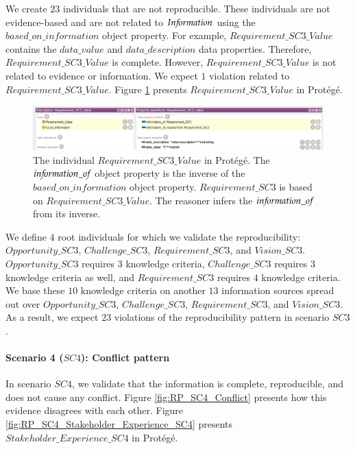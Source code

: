 We create $23$ individuals that are not reproducible. These individuals are not evidence-based and are not related to $In{\mkern-2mu f\mkern-3mu}ormation$ using the $based\_on\_information$ object property. For example, $Requirement\_SC3\_Value$ contains the $data\_value$ and $data\_description$ data properties. Therefore, $Requirement\_SC3\_Value$ is complete. However, $Requirement\_SC3\_Value$ is not related to evidence or information. We expect $1$ violation related to $Requirement\_SC3\_Value$. Figure \ref{fig:RP_SC4_Requirement_SC3_Value} presents $Requirement\_SC3\_Value$ in Prot\'eg\'e.

\begin{figure}[H]
\centering
  \includegraphics[width=17cm]{../../Images/05_Validation/05_RP_SC3_Requirement_SC3_Value.png}
  \caption{The individual $Requirement\_SC3\_Value$ in Prot\'eg\'e. The $in{\mkern-2mu f\mkern-3mu}ormation\_o{\mkern-2mu f\mkern-3mu}$ object property is the inverse of the $based\_on\_information$ object property. $Requirement\_SC3$ is based on $Requirement\_SC3\_Value$. The reasoner infers the $in{\mkern-2mu f\mkern-3mu}ormation\_o{\mkern-2mu f\mkern-3mu}$ from its inverse.}
  \label{fig:RP_SC4_Requirement_SC3_Value}
\end{figure}

We define $4$ root individuals for which we validate the reproducibility: $Opportunity\_SC3$, $Challenge\_SC3$, $Requirement\_SC3$, and $Vision\_SC3$. $Opportunity\_SC3$ requires $3$ knowledge criteria, $Challenge\_SC3$ requires $3$ knowledge criteria as well, and $Requirement\_SC3$ requires $4$ knowledge criteria. We base these $10$ knowledge criteria on another $13$ information sources spread out over $Opportunity\_SC3$, $Challenge\_SC3$, $Requirement\_SC3$, and $Vision\_SC3$. As a result, we expect $23$ violations of the reproducibility pattern in scenario $SC3$.

\paragraph{Scenario 4 ($SC4$): Conflict pattern}
In scenario $SC4$, we validate that the information is complete, reproducible, and does not cause any conflict. Figure \ref{fig:RP_SC4_Conflict} presents how this evidence disagrees with each other. Figure \ref{fig:RP_SC4_Stakeholder_Experience_SC4} presents $Stakeholder\_Experience\_SC4$ in Prot\'eg\'e.

